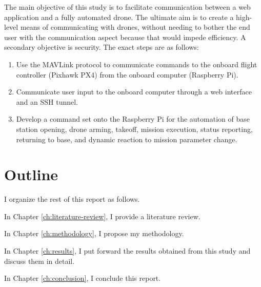 The main objective of this study is to facilitate communication between a web application and a fully automated drone. The ultimate aim is to create a high-level means of communicating with drones, without needing to bother the end user with the communication aspect because that would impede efficiency. A secondary objective is security.
The exact steps are as follows:

\begin{enumerate}
  \item Use the MAVLink protocol to communicate commands to the  onboard flight controller (Pixhawk PX4) from the onboard computer (Raspberry Pi).
  \item Communicate user input to the onboard computer through a web interface and an SSH tunnel.
  \item Develop a command set onto the Raspberry Pi for the automation of base station opening, drone arming, takeoff, mission execution, status reporting, returning to base, and dynamic reaction to mission parameter change.
\end{enumerate}


\section{Outline}
I organize the rest of this report as follows.

In Chapter \ref{ch:literature-review}, I provide a literature review.

In Chapter \ref{ch:methodology}, I propose my methodology.

In Chapter \ref{ch:results}, I put forward the results obtained from this study and discuss them in detail.

In Chapter \ref{ch:conclusion}, I conclude this report.



\FloatBarrier
